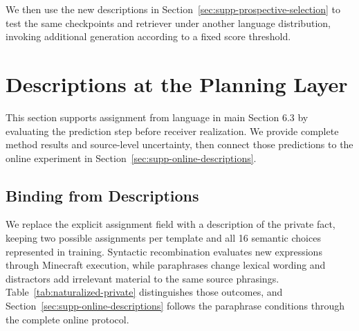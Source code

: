 \documentclass[sigconf,nonacm,balance=false]{aamas}
\begin{document}
We then use the new descriptions in Section~\ref{sec:supp-prospective-selection} to test the same checkpoints and retriever under another language distribution, invoking additional generation according to a fixed score threshold.

\section{Descriptions at the Planning Layer}
\label{sec:supp-planning}

This section supports assignment from language in main Section 6.3 by evaluating the prediction step before receiver realization. We provide complete method results and source-level uncertainty, then connect those predictions to the online experiment in Section~\ref{sec:supp-online-descriptions}.

\subsection{Binding from Descriptions}\label{sec:supp-planning-descriptions}

We replace the explicit assignment field with a description of the private fact, keeping two possible assignments per template and all 16 semantic choices represented in training. Syntactic recombination evaluates new expressions through Minecraft execution, while paraphrases change lexical wording and distractors add irrelevant material to the same source phrasings. Table~\ref{tab:naturalized-private} distinguishes those outcomes, and Section~\ref{sec:supp-online-descriptions} follows the paraphrase conditions through the complete online protocol.
\end{document}
